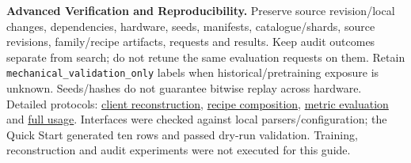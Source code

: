\documentclass[10pt,a4paper]{article}
\newcommand{\code}[1]{\nolinkurl{#1}}
\begin{document}
\textbf{Advanced Verification and Reproducibility.} Preserve source revision/local changes, dependencies, hardware, seeds, manifests, catalogue/shards, source revisions, family/recipe artifacts, requests and results. Keep audit outcomes separate from search; do not retune the same evaluation requests on them. Retain \code{mechanical_validation_only} labels when historical/pretraining exposure is unknown. Seeds/hashes do not guarantee bitwise replay across hardware. Detailed protocols: \href{../../docs/client-reconstruction.md}{client reconstruction}, \href{../../docs/recipe-composition.md}{recipe composition}, \href{../../docs/metric-evaluation-protocol.md}{metric evaluation} and \href{../../docs/usage.md}{full usage}. Interfaces were checked against local parsers/configuration; the Quick Start generated ten rows and passed dry-run validation. Training, reconstruction and audit experiments were not executed for this guide.
\end{document}
